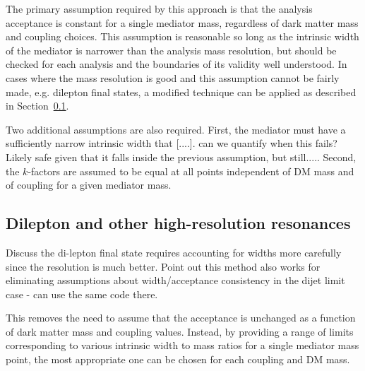 \documentclass[a4paper, 11pt,notoc]{article}
\begin{document}


The primary assumption required by this approach is that the analysis acceptance is constant for a single mediator mass, regardless of dark matter mass and coupling choices. This assumption is reasonable so long as the intrinsic width of the mediator is narrower than the analysis mass resolution, but should be checked for each analysis and the boundaries of its validity well understood. In cases where the mass resolution is good and this assumption cannot be fairly made, e.g. dilepton final states, a modified technique can be applied as described in Section~\ref{sec:dilepton}. 

Two additional assumptions are also required. First, the mediator must have a sufficiently narrow intrinsic width that [....]. {\color{red} can we quantify when this fails? Likely safe given that it falls inside the previous assumption, but still....}. Second, the $k$-factors are assumed to be equal at all points independent of DM mass and of coupling for a given mediator mass.

 

\subsection{Dilepton and other high-resolution resonances}
\label{sec:dilepton}


Discuss the di-lepton final state requires accounting for widths more carefully since the resolution is much better. Point out this method also works for eliminating assumptions about width/acceptance consistency in the dijet limit case - can use the same code there. 

This removes the need to assume that the acceptance is unchanged as a function of dark matter mass and coupling values. Instead, by providing a range of limits corresponding to various intrinsic width to mass ratios for a single mediator mass point, the most appropriate one can be chosen for each coupling and DM mass.
\end{document}
